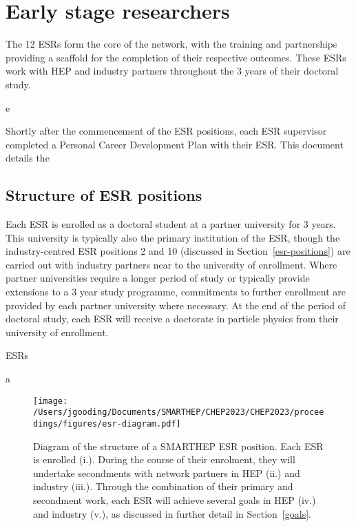 \section{Early stage researchers}
\label{esrs}
The 12 ESRs form the core of the network, with the training and partnerships providing a scaffold for the completion of their respective outcomes. These ESRs work with HEP and industry partners throughout the 3 years of their doctoral study.\par
e\par
Shortly after the commencement of the ESR positions, each ESR supervisor completed a Personal Career Development Plan with their ESR. This document details the 

\subsection{Structure of ESR positions}
\label{esr-structure}
Each ESR is enrolled as a doctoral student at a partner university for 3 years. This university is typically also the primary institution of the ESR, though the industry-centred ESR positions 2 and 10 (discussed in Section~\ref{esr-positions}) are carried out with industry partners near to the university of enrollment. Where partner universities require a longer period of study or typically provide extensions to a 3 year study programme, commitments to further enrollment are provided by each partner university where necessary. At the end of the period of doctoral study, each ESR will receive a doctorate in particle physics from their university of enrollment.\par
ESRs\par
a
\begin{figure*}[h!]
    \centering
    \texttt{[image: /Users/jgooding/Documents/SMARTHEP/CHEP2023/CHEP2023/proceedings/figures/esr-diagram.pdf]}
    \caption{Diagram of the structure of a SMARTHEP ESR position. Each ESR is enrolled (i.). During the course of their enrolment, they will undertake secondments with network partners in HEP (ii.) and industry (iii.). Through the combination of their primary and secondment work, each ESR will achieve several goals in HEP (iv.) and industry (v.), as discussed in further detail in Section~\ref{goals}.}
    \label{esr-diagram}       %
\end{figure*}

